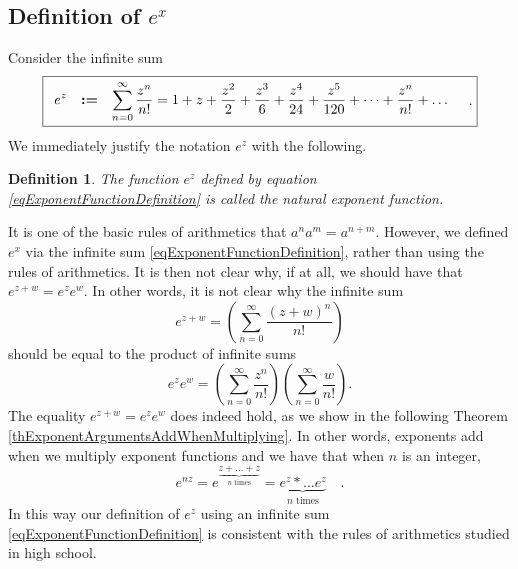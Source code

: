 \documentclass[12pt]{book}
\newcommand{\eqdef}{\textbf{:=}}
\newcommand{\importantFormula}[1]{\begin{equation} \boxed{#1} \end{equation}}
\newtheorem{definition}[theorem]{Definition}
\begin{document}
\subsection{Definition of $e^x$}
Consider the infinite sum
\importantFormula{\label{eqExponentFunctionDefinition}
\begin{array}{rcl}
\displaystyle e^{z}&\eqdef &\displaystyle \sum_{n=0}^{\infty} \frac{z^n}{n!} = 1+z+\frac{z^{2}}{2}+\frac{z^3}{6}+\frac{z^4}{24}+\frac{z^5}{120}+\dots+\frac{z^n}{n!}+\dots\\
\end{array} \quad .
}
We immediately justify the notation $e^z$ with the following.
\begin{definition}\label{defNaturalExponent}
 The function $e^z$ defined by equation \eqref{eqExponentFunctionDefinition} is called the natural exponent function.
\end{definition}
It is one of the basic rules of arithmetics that $a^n a^{m}= a^{n+m} $. However, we defined $e^x$ via the infinite sum \eqref{eqExponentFunctionDefinition}, rather than using the rules of arithmetics. It is then not clear why, if at all, we should have that $e^{z+w}=e^{z}e^{w}$. In other words, it is not clear why the infinite sum 
\[
e^{z+w} =\left(\sum\limits_{n=0}^{\infty} \frac{(z+w)^n}{n!}\right)
\]
should be equal to the product of infinite sums
\[
e^{z} e^w=\left(\sum\limits_{n=0}^{\infty} \frac{z^n}{n!}\right)\left(\sum\limits_{n=0}^{\infty} \frac{w}{n!} \right) .
\]
The equality $e^{z+w}= e^{z}e^{w}$ does indeed hold, as we show in the following Theorem \ref{thExponentArgumentsAddWhenMultiplying}. In other words, exponents add when we multiply exponent functions and we have that when $n$ is an integer, 
\begin{equation}\label{eqExponentToIntegerPowerRespectsArithmetics}
e^{n z}= e^{\underbrace{z+\dots +z}_{n\text{ times}} }=\underbrace{ e^{z}*\dots e^{z}}_{n \text{ times}}  \quad .
\end{equation}
In this way our definition of  $e^{z}$ using an infinite sum \eqref{eqExponentFunctionDefinition} is consistent with the rules of arithmetics studied in high school. 
\end{document}
